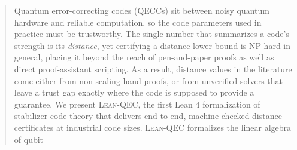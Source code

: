 \begin{abstract}
%
%
Quantum error-correcting codes (QECCs) sit between noisy quantum hardware and
reliable computation, so the code parameters used in practice must be
trustworthy. The single number that summarizes a code's strength is its
\emph{distance}, yet certifying a distance lower bound is NP-hard in general,
placing it beyond the reach of pen-and-paper proofs as well as direct
proof-assistant scripting. As a result, distance values in the literature
come either from non-scaling hand proofs, or from
unverified solvers that leave a trust gap exactly where the code is supposed to
provide a guarantee.
We present \textsc{Lean-QEC}, the first Lean 4 formalization of stabilizer-code
theory that delivers end-to-end, machine-checked distance certificates at
industrial code sizes. \textsc{Lean-QEC} formalizes the linear algebra of qubit

\end{abstract}
